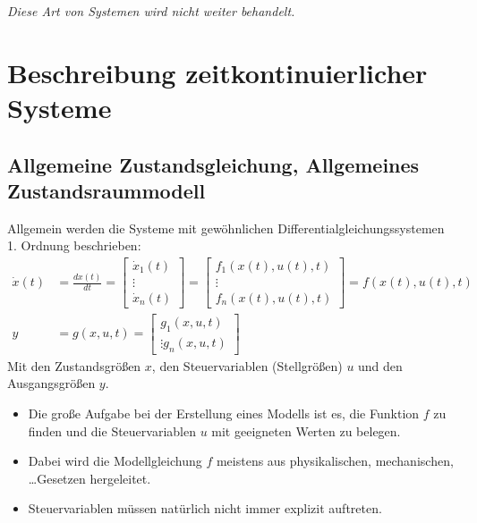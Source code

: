 \documentclass[a4paper, 11pt, accentcolor = tud3b]{tudreport}
\begin{document}
            \textit{Diese Art von Systemen wird nicht weiter behandelt.}

        \section{Beschreibung zeitkontinuierlicher Systeme} %
            \subsection{Allgemeine Zustandsgleichung, Allgemeines Zustandsraummodell} %
                Allgemein werden die Systeme mit gewöhnlichen Differentialgleichungssystemen 1. Ordnung beschrieben:
                \begin{align*}
	                \dot{x}(t) &= \frac{d x(t)}{dt} =
		                \begin{bmatrix}
			                \dot{x} _ 1 (t) \\
			                \vdots \\
			                \dot{x} _ n (t)
		                \end{bmatrix}
		            =
			            \begin{bmatrix}
				            f _ 1 (x(t), u(t), t) \\
				            \vdots \\
				            f _ n (x(t), u(t), t)
			            \end{bmatrix}
			        = f(x(t), u(t), t) \\
			        y &= g(x, u, t) =
				        \begin{bmatrix}
					        g _ 1 (x, u, t) \\
					        \vdots
					        g _ n (x, u, t)
				        \end{bmatrix}
                \end{align*}
                Mit den Zustandsgrößen \(x\), den Steuervariablen (Stellgrößen) \(u\) und den Ausgangsgrößen \(y\).
                
                \begin{itemize}
                	\item Die große Aufgabe bei der Erstellung eines Modells ist es, die Funktion \(f\) zu finden und die Steuervariablen \(u\) mit geeigneten Werten zu belegen.
                	\item Dabei wird die Modellgleichung \(f\) meistens aus physikalischen, mechanischen, \dots Gesetzen hergeleitet.
                	\item Steuervariablen müssen natürlich nicht immer explizit auftreten.
                \end{itemize}
\end{document}
